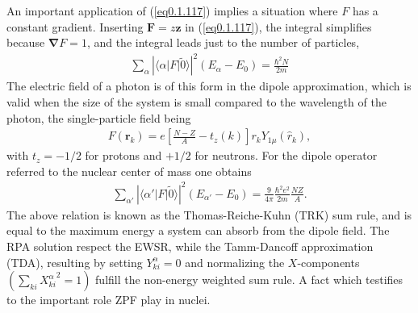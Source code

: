 \documentclass[a4paper,11pt]{book}
\numberwithin{equation}{section}
\numberwithin{figure}{section}
\numberwithin{table}{section}
\newcommand{\braket}[1]{\langle {#1} \rangle }
\begin{document}
An important application of (\ref{eq0.1.117}) implies a situation where $F$ has a constant gradient. Inserting $\mathbf F=z\mathbf z$ in (\ref{eq0.1.117}), the integral simplifies because $\pmb \nabla F=1$, and the integral leads just to the number of particles,
\begin{align}\label{eq0.1.118}
\sum_{\alpha}|\braket{\alpha|F|\tilde 0}|^2(E_{\alpha}-E_0)=\frac{\hbar^2N}{2m}
\end{align}
The electric field of a photon is of this form in the dipole approximation, which is valid when the size of the system is small compared to the wavelength of the photon, the single-particle field being
\begin{align}\label{eq0.1.119}
F(\mathbf r_k)=e\left[\frac{N-Z}{A}-t_z(k)\right]r_kY_{1\mu}(\hat r_k),
\end{align}
with $t_z=-1/2$ for protons and $+1/2$ for neutrons. For the dipole operator referred to the nuclear center of mass one obtains
\begin{align}\label{eq0.1.120}
\sum_{\alpha'}|\braket{\alpha'|F|\tilde 0}|^2(E_{\alpha'}-E_0)=\frac{9}{4\pi}\frac{\hbar^2e^2}{2m}\frac{NZ}{A}.
\end{align}
 The above relation is known as the Thomas-Reiche-Kuhn (TRK) sum rule, and is equal to the maximum energy a system can absorb from the dipole field. The RPA solution respect the EWSR, while the Tamm-Dancoff approximation (TDA), resulting by setting $Y^\alpha_{ki}=0$ and normalizing the $X$-components $(\sum_{ki}{X^{\alpha}_{ki}}^2=1)$ fulfill the non-energy weighted sum rule. A fact which testifies to the important role ZPF play in nuclei.
\end{document}

